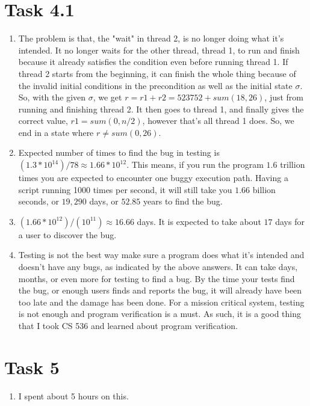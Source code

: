 \documentclass{article}
\newcommand{\answer}{\item[]} %
\begin{document}
	\section{Task 4.1}
		\begin{enumerate}[label = {(\alph*)}]
			
			\item The problem is that, the "wait" in thread 2, is no longer doing what it's intended. It no longer waits for the other thread, thread 1, to run and finish because it already satisfies the condition even before running thread 1. If thread 2 starts from the beginning, it can finish the whole thing because of the invalid initial conditions in the precondition as well as the initial state $\sigma$. So, with the given $\sigma$, we get $r = r1 + r2 = 523752 + sum(18, 26)$, just from running and finishing thread 2. It then goes to thread 1, and finally gives the correct value, $r1 = sum(0, n / 2)$, however that's all thread 1 does. So, we end in a state where $r \neq sum(0, 26)$.
			
			\item Expected number of times to find the bug in testing is $(1.3 * 10^{14}) / 78 \approx 1.66 * 10^{12}$. This means, if you run the program $1.6$ trillion times you are expected to encounter one buggy execution path. Having a script running 1000 times per second, it will still take you $1.66$ billion seconds, or $19,290$ days, or $52.85$ years to find the bug.
			
			\item $(1.66 * 10^{12}) / (10^{11}) \approx 16.66$ days. It is expected to take about $17$ days for a user to discover the bug. 
			
			\item Testing is not the best way make sure a program does what it's intended and doesn't have any bugs, as indicated by the above answers. It can take days, months, or even more for testing to find a bug. By the time your tests find the bug, or enough users finds and reports the bug, it will already have been too late and the damage has been done. For a mission critical system, testing is not enough and program verification is a must. As such, it is a good thing that I took CS 536 and learned about program verification.
			
		\end{enumerate}
	
	\section{Task 5}
		\begin{enumerate}[label = {(\alph*)}]
			
			\answer I spent about 5 hours on this.
			
		\end{enumerate}
\end{document}
